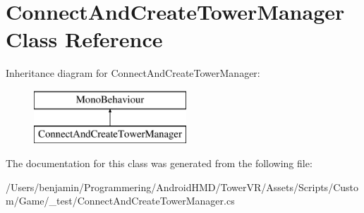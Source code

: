 \hypertarget{class_connect_and_create_tower_manager}{}\section{Connect\+And\+Create\+Tower\+Manager Class Reference}
\label{class_connect_and_create_tower_manager}
Inheritance diagram for Connect\+And\+Create\+Tower\+Manager\+:\begin{figure}[H]
\begin{center}
\leavevmode
\includegraphics[height=2.000000cm]{class_connect_and_create_tower_manager}
\end{center}
\end{figure}


The documentation for this class was generated from the following file\+:\begin{DoxyCompactItemize}
\item 
/\+Users/benjamin/\+Programmering/\+Android\+H\+M\+D/\+Tower\+V\+R/\+Assets/\+Scripts/\+Custom/\+Game/\+\_\+test/Connect\+And\+Create\+Tower\+Manager.\+cs\end{DoxyCompactItemize}
